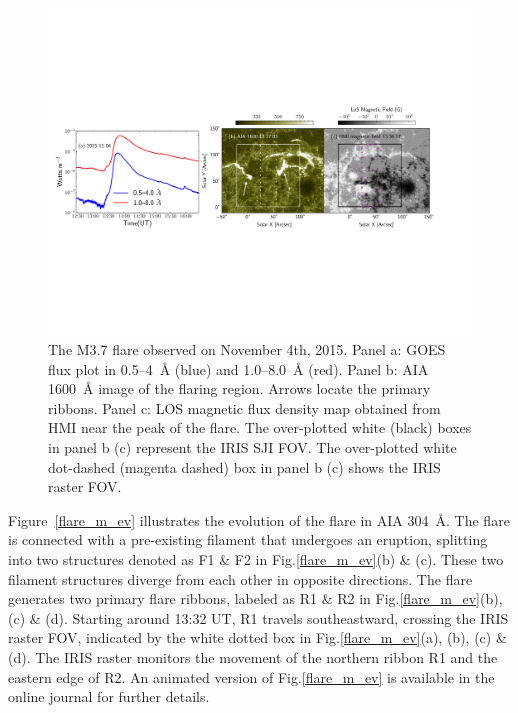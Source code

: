 \begin{figure}[ht!]
    \centering
\includegraphics[trim={0.4cm 7cm 2.5cm 6.5cm},clip,width=\linewidth]{Figures/Flare_M_Nov04_2015_2.pdf}
\caption[The observations of the M3.7 flare on November 4th, 2015]{The M3.7 flare observed on November 4th, 2015. Panel a: GOES flux plot in 0.5{--}4~{\AA} (blue) and 1.0{--}8.0~{\AA} (red). Panel b: AIA 1600~{\AA} image of the flaring region. Arrows locate the primary ribbons. Panel c: LOS magnetic flux density map obtained from HMI near the peak of the flare. The over-plotted white (black) boxes in panel b (c) represent the IRIS SJI FOV. The over-plotted white dot-dashed (magenta dashed) box in panel b (c) shows the IRIS raster FOV.}\label{flare1}
\end{figure}

Figure~\ref{flare_m_ev} illustrates the evolution of the flare in AIA 304~{\AA}. The flare is connected with a pre-existing filament that undergoes an eruption, splitting into two structures denoted as F1 \& F2 in Fig.\ref{flare_m_ev}(b) \& (c). These two filament structures diverge from each other in opposite directions. The flare generates two primary flare ribbons, labeled as R1 \& R2 in Fig.\ref{flare_m_ev}(b), (c) \& (d). Starting around 13:32 UT, R1 travels southeastward, crossing the IRIS raster FOV, indicated by the white dotted box in Fig.\ref{flare_m_ev}(a), (b), (c) \& (d). The IRIS raster monitors the movement of the northern ribbon R1 and the eastern edge of R2. An animated version of Fig.\ref{flare_m_ev} is available in the online journal for further details.

